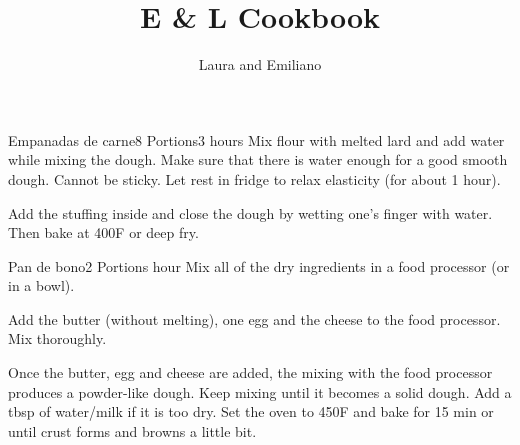 \documentclass{article}
\title{\bfseries E \& L Cookbook}
\author{Laura and Emiliano}
\begin{document}
\maketitle

\begin{recipe}{Empanadas de carne}{8 Portions}{3 hours}
  Mix flour with melted lard and add water while mixing the dough. Make sure that
  there is water enough for a good smooth dough. Cannot be sticky. Let rest in
  fridge to relax elasticity (for about 1 hour).

\freeform
  Add the stuffing inside and close the dough by wetting one's finger with
  water. Then bake at 400F or deep fry.

%
\end{recipe}

\begin{recipe}{Pan de bono}{2 Portions}{ hour}
  Mix all of the dry ingredients in a food processor (or in a bowl).

  Add the butter (without melting), one egg and the cheese to the food
  processor. Mix thoroughly.

  \freeform
  Once the butter, egg and cheese are added, the mixing with the food processor
  produces a powder-like dough. Keep mixing until it becomes a solid dough. Add
  a tbsp of water/milk if it is too dry.
 Set the oven to 450\degree{}F and bake for 15 min or until crust forms and
 browns a little bit.%
\end{recipe}
\end{document}
